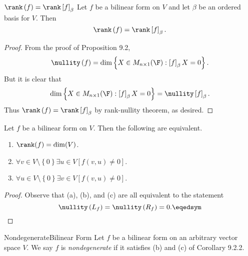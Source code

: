 \documentclass[linearalgebra]{subfiles}
\begin{document}
    \begin{cor}{$\rank\left( f \right) =\rank\left[ f \right] _\beta$}
        Let $f$ be a bilinear form on $V$ and let $\beta$ be an ordered basis for $V$. Then
        \begin{equation*}
            \rank\left( f \right) = \rank\left[ f \right] _\beta.
        \end{equation*}
    \end{cor}	

    \begin{proof}
        From the proof of Proposition 9.2,
        \begin{equation*}
            \nullity\left( f \right) = \dim\left\lbrace X\in M_{n\times 1}(\F) : \left[ f \right] _\beta X = 0 \right\rbrace .
        \end{equation*}
        But it is clear that
        \begin{equation*}
            \dim\left\lbrace X\in M_{n\times 1}(\F) : \left[ f \right] _\beta X = 0 \right\rbrace = \nullity\left[ f \right] _\beta.
        \end{equation*}
        Thus $\rank\left( f \right) = \rank\left[ f \right] _\beta$ by rank-nullity theorem, as desired.
    \end{proof}

    \clearpage
    \begin{cor}{}
        Let $f$ be a bilinear form on $V$. Then the following are equivalent.
        \begin{enumerate}
            \item $\rank(f) = \dim(V)$.
            \item $\forall v\in V\setminus \left\lbrace 0 \right\rbrace\exists u\in V \left[ f\left( v,u \right) \neq 0 \right]$.
            \item $\forall u\in V\setminus \left\lbrace 0 \right\rbrace\exists v\in V \left[ f\left( v,u \right) \neq 0 \right]$.
        \end{enumerate}
    \end{cor}	

    \begin{proof}
        Observe that (a), (b), and (c) are all equivalent to the statement
        \begin{equation*}
            \nullity\left( L_f \right) = \nullity\left( R_f \right) = 0. \eqedsym
        \end{equation*}
    \end{proof}

    \begin{definition}{Nondegenerate}{Bilinear Form}
        Let $f$ be a bilinear form on an arbitrary vector space $V$. We say $f$ is \emph{nondegenerate} if it satisfies (b) and (c) of Corollary 9.2.2.
    \end{definition}
\end{document}

